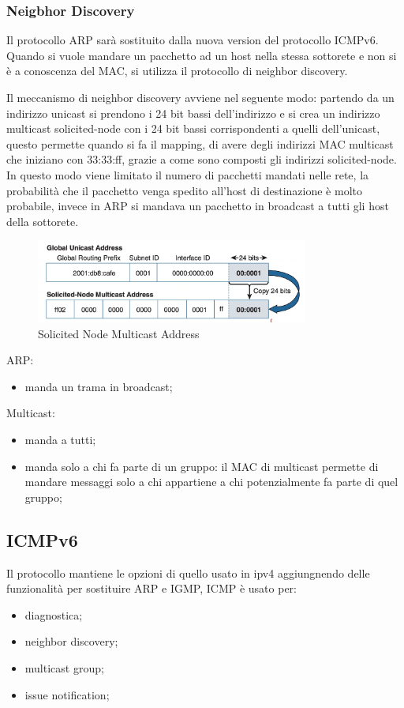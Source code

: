 \documentclass[12pt]{article}
\begin{document}
\subsubsection{Neigbhor Discovery}
Il protocollo ARP sar\`a sostituito dalla nuova version del protocollo ICMPv6. Quando si vuole mandare un pacchetto ad un host nella stessa sottorete e non si \`e a conoscenza del MAC, si utilizza il protocollo di neighbor discovery.

Il meccanismo di neighbor discovery avviene nel seguente modo: partendo da un indirizzo unicast si prendono i 24 bit bassi dell'indirizzo e si crea un indirizzo multicast solicited-node con i 24 bit bassi corrispondenti a quelli dell'unicast, questo permette quando si fa il mapping, di avere degli indirizzi MAC multicast che iniziano con 33:33:ff, grazie a come sono composti gli indirizzi solicited-node. In questo modo viene limitato il numero di pacchetti mandati nelle rete, la probabilit\`a che il pacchetto venga spedito all'host di destinazione \`e molto probabile, invece in ARP si mandava un pacchetto in broadcast a tutti gli host della sottorete.
\begin{figure}[H]
    \centering
    \includegraphics[width=0.8\textwidth]{solicited-node-multicast-address.png}
    \caption{Solicited Node Multicast Address}
    \label{fig:solicited-node-multicast-address}
\end{figure}

ARP:
\begin{itemize}
    \item manda un trama in broadcast;
\end{itemize}

Multicast:
\begin{itemize}
    \item manda a tutti;
    \item manda solo a chi fa parte di un gruppo: il MAC di multicast permette di mandare messaggi solo a chi appartiene a chi potenzialmente fa parte di quel gruppo;
\end{itemize}


\subsection{ICMPv6}
Il protocollo mantiene le opzioni di quello usato in ipv4 aggiungnendo delle funzionalit\`a per sostituire ARP e IGMP, ICMP \`e usato per:
\begin{itemize}
    \item diagnostica;
    \item neighbor discovery;
    \item multicast group;
    \item issue notification;
\end{itemize}
\end{document}

